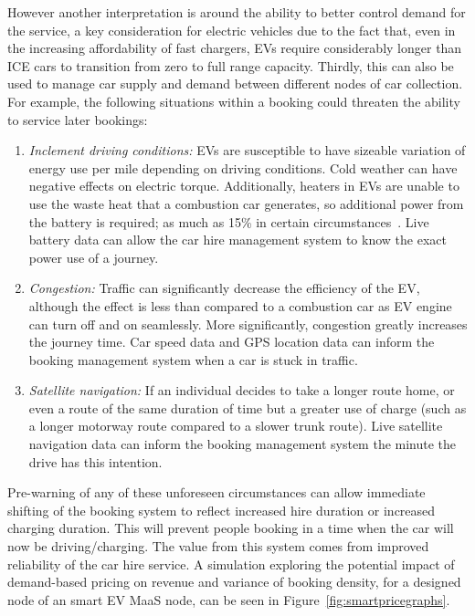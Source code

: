 \documentclass[journal]{IEEEtran}
\begin{document}
However another interpretation is around the ability to better control
demand for the service, a key consideration for electric vehicles due
to the fact that, even in the increasing affordability of fast
chargers, EVs require considerably longer than ICE cars to transition
from zero to full range capacity. Thirdly, this can also be used to
manage car supply and demand between different nodes of car
collection. For example, the following situations within a booking
could threaten the ability to service later bookings:

\begin{enumerate}
\item {\emph{Inclement driving conditions:}} EVs are susceptible to
have sizeable variation of energy use per mile depending on driving
conditions. Cold weather can have negative effects on electric
torque. Additionally, heaters in EVs are unable to use the waste heat
that a combustion car generates, so additional power from the battery
is required; as much as 15\% in certain
circumstances~\cite{dft:2008}. Live battery data can allow the car
hire management system to know the exact power use of a journey.
\item {\emph{Congestion:}} Traffic can significantly decrease the
efficiency of the EV, although the effect is less than compared to a
combustion car as EV engine can turn off and on seamlessly. More
significantly, congestion greatly increases the journey time. Car
speed data and GPS location data can inform the booking management
system when a car is stuck in traffic.
\item {\emph{Satellite navigation:}} If an individual decides to take
a longer route home, or even a route of the same duration of time but
a greater use of charge (such as a longer motorway route compared to a
slower trunk route). Live satellite navigation data can inform the
booking management system the minute the drive has this intention.
\end{enumerate}

Pre-warning of any of these unforeseen circumstances can allow
immediate shifting of the booking system to reflect increased hire
duration or increased charging duration. This will prevent people
booking in a time when the car will now be driving/charging. The value
from this system comes from improved reliability of the car hire
service. A simulation exploring the potential impact of demand-based
pricing on revenue and variance of booking density, for a designed
node of an smart EV MaaS node, can be seen in
Figure~\ref{fig:smartpricegraphs}.
\end{document}
